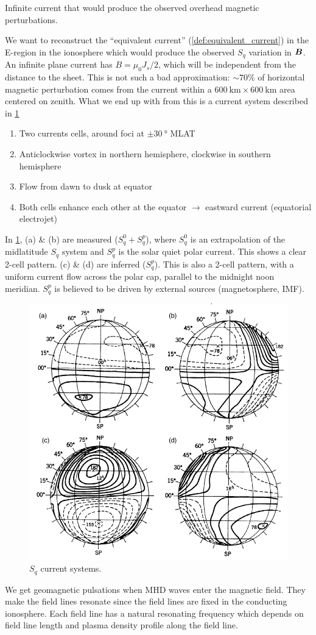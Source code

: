 \begin{definition}\label{def:equivalent_current}
    Infinite current that would produce the observed overhead magnetic perturbations.
\end{definition}
We want to reconstruct the ``equivalent current'' (\cref{def:equivalent_current}) in the E-region in the ionosphere which would produce the observed \(S_q\) variation in \(\boldsymbol{B}\). An infinite plane current has \(B=\mu_0J_s/2\), which will be independent from the distance to the sheet. This is not such a bad approximation: \(\sim 70\% \) of horizontal magnetic perturbation comes from the current within a \(\SI{600}{\kilo\metre}\times\SI{600}{\kilo\metre}\) area centered on zenith. What we end up with from this is a current system described in \cref{fig:solar_quiet}
\begin{enumerate}[\(\bullet \)]
    \item Two currents cells, around foci at \(\pm\SI{30}{\degree}\) MLAT
    \item Anticlockwise vortex in northern hemisphere, clockwise in southern hemisphere
    \item Flow from dawn to dusk at equator
    \item Both cells enhance each other at the equator \(\rightarrow \) eastward current (equatorial electrojet)
\end{enumerate}
In \cref{fig:solar_quiet}, (a) \& (b) are measured (\(S_q^0+S_q^p\)), where \(S_q^0\) is an extrapolation of the midlatitude \(S_q\) system and \(S_q^p\) is the solar quiet polar current. This shows a clear 2-cell pattern. (c) \& (d) are inferred (\(S_q^p\)). This is also a 2-cell pattern, with a uniform current flow across the polar cap, parallel to the midnight noon meridian. \(S_q^p\) is believed to be driven by external sources (magnetosphere, IMF).
\begin{figure}[t]
    \centering
    \includegraphics[width=.65\linewidth]{bilder/L3_solar_quiet.png}
    \caption{\(S_q\) current systems.}\label{fig:solar_quiet}
\end{figure}
We get geomagnetic pulsations when MHD waves enter the magnetic field. They make the field lines resonate since the field lines are fixed in the conducting ionosphere. Each field line has a natural resonating frequency which depends on field line length and plasma density profile along the field line.

